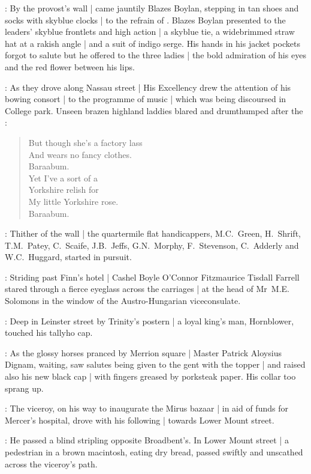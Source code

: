 :
By the provost's wall |
came jauntily Blazes Boylan,
stepping in tan shoes
and socks with skyblue clocks |
to the refrain of
.
Blazes Boylan presented to the leaders' skyblue frontlets and high action |
a skyblue tie,
a widebrimmed straw hat at a rakish angle |
and a suit of indigo serge.
His hands in his jacket pockets forgot to salute 
but he offered to the three ladies |
the bold admiration of his eyes
and the red flower between his lips.

:
As they drove along Nassau street |
His Excellency
drew the attention of his bowing consort |
to the programme of music |
which was being discoursed in College park.
Unseen brazen highland laddies
blared and drumthumped
after the :%

\begin{verse}
    But though she's a factory lass \\
    And wears no fancy clothes. \\
    Baraabum. \\
    Yet I've a sort of a \\
    Yorkshire relish for \\
    My little Yorkshire rose. \\
    Baraabum.
\end{verse}

:
Thither of the wall |
the quartermile flat handicappers,
M.C.~Green,
H.~Shrift,
T.M.~Patey,
C.~Scaife,
J.B.~Jeffs,
G.N.~Morphy,
F.~Stevenson,
C.~Adderly
and W.C.~Huggard,
started in pursuit.%

:
Striding past Finn's hotel |
Cashel Boyle O'Connor Fitzmaurice Tisdall Farrell
stared through a fierce eyeglass
across the carriages |
at the head of Mr~M.E. Solomons
in the window of the Austro-Hungarian viceconsulate.

:
Deep in Leinster street by Trinity's postern |
a loyal king's man, Hornblower,
touched his tallyho cap.

:
As the glossy horses pranced by Merrion square |
Master Patrick Aloysius Dignam, waiting,
saw salutes being given to the gent with the topper |
and raised also his new black cap |
with fingers greased by porksteak paper.
His collar too sprang up.

:
The viceroy,
on his way to inaugurate the Mirus bazaar |
in aid of funds for Mercer's hospital,%
drove with his following |
towards Lower Mount street.

:
He passed a blind stripling opposite Broadbent's.
In Lower Mount street |
a pedestrian in a brown macintosh,
eating dry bread,
passed swiftly and unscathed across the viceroy's path.


